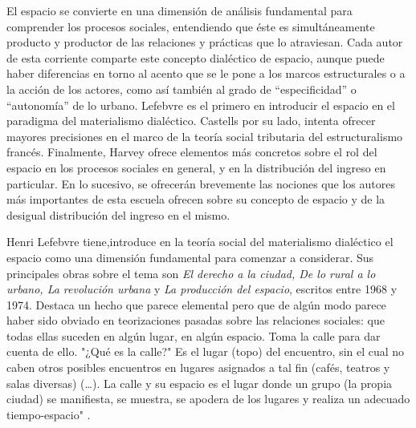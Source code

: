 El espacio se convierte en una dimensión de análisis fundamental para comprender los procesos sociales, entendiendo que éste es simultáneamente producto y productor de las relaciones y prácticas que lo atraviesan. Cada autor de esta corriente comparte este concepto dialéctico de espacio, aunque puede haber diferencias en torno al acento que se le pone a los marcos estructurales o a la acción de los actores, como así también al grado de “especificidad” o “autonomía” de lo urbano. Lefebvre \citeyear{lefebvre} es el primero en introducir el espacio en el paradigma del materialismo dialéctico. Castells \citeyear{castells} por su lado, intenta ofrecer mayores precisiones en el marco de la teoría social tributaria del estructuralismo francés. Finalmente, Harvey \citeyear{harvey} ofrece elementos más concretos sobre el rol del espacio en los procesos sociales en general, y en la distribución del ingreso en particular. En lo sucesivo, se ofrecerán brevemente las nociones que los autores más importantes de esta escuela ofrecen sobre su concepto de espacio y de la desigual distribución del ingreso en el mismo. 
 
Henri Lefebvre tiene,introduce en la teoría social del materialismo dialéctico el espacio como una dimensión fundamental para comenzar a considerar. Sus principales obras sobre el tema son \textit{El derecho a la ciudad, De lo rural a lo urbano, La revolución urbana} y \textit{La producción del espacio}, escritos entre 1968 y 1974. Destaca un hecho que parece elemental pero que de algún modo parece haber sido obviado en teorizaciones pasadas sobre las relaciones sociales: que todas ellas suceden en algún lugar, en algún espacio. Toma la calle para dar cuenta de ello. "¿Qué es la calle?" Es el lugar (topo) del encuentro, sin el cual no caben otros posibles encuentros en lugares asignados a tal fin (cafés, teatros y salas diversas) (…). La calle y su espacio es el lugar donde un grupo (la propia ciudad) se manifiesta, se muestra, se apodera de los lugares y realiza un adecuado tiempo-espacio" \cite[~25]{lefebvre}. 

